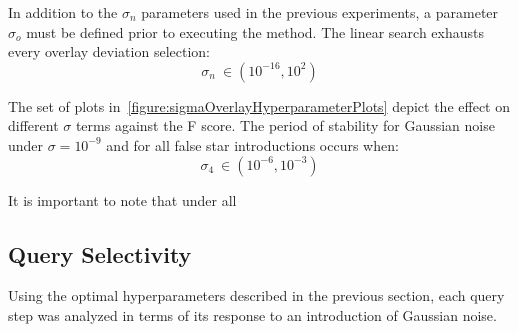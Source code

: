 In addition to the $\sigma_n$ parameters used in the previous experiments, a parameter $\sigma_o$ must be defined
prior to executing the  method.
The linear search exhausts every overlay deviation selection:
\begin{equation}
    \label{eq:linearSearchSigmaOverlay}
    \sigma_n \ \in (10^{-16}, 10^{2})
\end{equation}

\begin{figure}
\end{figure}

The set of plots in~\autoref{figure:sigmaOverlayHyperparameterPlots} depict the effect on different $\sigma$ terms
against the F score.
The period of stability for Gaussian noise under $\sigma = 10^{-9}$ and for all false star introductions occurs when:
\begin{equation}
    \label{eq:sigmaOverlayStableRegion}
    \sigma_4 \ \in (10^{-6}, 10^{-3})
\end{equation}

It is important to note that under all

\subsection{Query Selectivity}\label{subsec:querySelectivityResults}
Using the optimal hyperparameters described in the previous section, each query step was analyzed in terms of its
response to an introduction of Gaussian noise.


